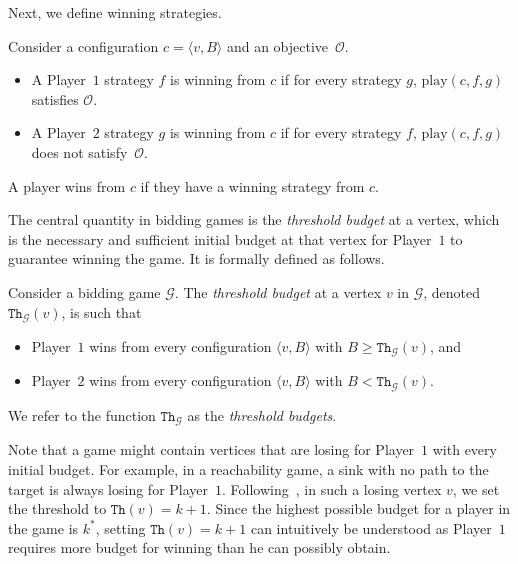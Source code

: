 \documentclass{theoretics}
\newcommand{\PO}{Player~$1$\xspace}
\newcommand{\PT}{Player~$2$\xspace}
\newcommand{\G}{{\mathcal G}}
\newcommand{\thresh}{\texttt{Th}\xspace}
\newcommand{\play}{\text{play}\xspace}
\newcommand{\zug}[1]{\langle #1  \rangle}
\newcommand{\Obj}{\mathcal{O}}
\begin{document}
Next, we define winning strategies.
\begin{definition}
Consider a configuration $c = \zug{v, B}$ and an objective~\(\Obj\).
\begin{itemize}
\item A \PO strategy $f$ is winning from \(c\) if for every strategy $g$, $\play(c, f, g)$ satisfies \(\Obj\). 
\item A \PT strategy \(g\) is winning from \(c\) if for every strategy \(f\), \(\play(c, f, g)\) does not satisfy~\(\Obj\). 
\end{itemize}
A player wins from \(c\) if they have a winning strategy from \(c\).
\end{definition}


The central quantity in bidding games is the {\em threshold budget} at a vertex, which is the necessary and sufficient initial budget at that vertex for \PO to guarantee winning the game. It is formally defined as follows.

\begin{definition} Consider a bidding game $\G$. The {\em threshold budget} at a vertex $v$ in $\G$, denoted $\thresh_\G(v)$, is such that 
\begin{itemize}
\item \PO wins from every configuration $\zug{v, B}$ with $B \geq \thresh_\G(v)$, and 
\item \PT wins from every configuration $\zug{v, B}$ with $B < \thresh_\G(v)$.
\end{itemize}
We refer to the function $\thresh_\G$ as the {\em threshold budgets}. 
\end{definition}


\begin{remark}
\label{rem:losing-vertices}
Note that a game might contain vertices that are losing for \PO with every initial budget. For example, in a reachability game, a sink with no path to the target is always losing for \PO. Following~\cite{DP10}, in such a losing vertex $v$, we set the threshold to $\thresh(v) = k+1$. Since the highest possible budget for a player in the game is $k^*$, setting $\thresh(v) = k+1$ can intuitively be understood as \PO requires more budget for winning than he can possibly obtain.  
\end{remark}
   
\end{document}
